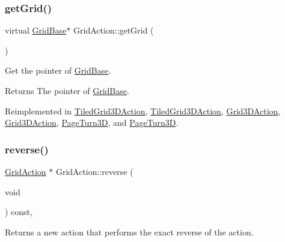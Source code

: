 \subsubsection{\texorpdfstring{get\+Grid()}{getGrid()}\hspace{0.1cm}{\footnotesize\ttfamily [2/2]}}
{\footnotesize\ttfamily virtual \hyperlink{classGridBase}{Grid\+Base}$\ast$ Grid\+Action\+::get\+Grid (\begin{DoxyParamCaption}{ }\end{DoxyParamCaption})\hspace{0.3cm}{\ttfamily [virtual]}}



Get the pointer of \hyperlink{classGridBase}{Grid\+Base}. 

\begin{DoxyReturn}{Returns}
The pointer of \hyperlink{classGridBase}{Grid\+Base}. 
\end{DoxyReturn}


Reimplemented in \hyperlink{classTiledGrid3DAction_a6a959d99477286fe1c467560638f1321}{Tiled\+Grid3\+D\+Action}, \hyperlink{classTiledGrid3DAction_a6481f8c3be55a8edc01527a7d62e9fce}{Tiled\+Grid3\+D\+Action}, \hyperlink{classGrid3DAction_a9b03fb743c9ba963d361b87ce975a642}{Grid3\+D\+Action}, \hyperlink{classGrid3DAction_ad68b52ba318636b43a4c7aab0a9c2887}{Grid3\+D\+Action}, \hyperlink{classPageTurn3D_a69c44c157a7652d2a183dba481bce69a}{Page\+Turn3D}, and \hyperlink{classPageTurn3D_a7b3315a39780438de87cbaa2c9c52c9c}{Page\+Turn3D}.

\mbox{\label{classGridAction_a30591fa53babcd92fb490762fe55b3f7}} 
\subsubsection{\texorpdfstring{reverse()}{reverse()}\hspace{0.1cm}{\footnotesize\ttfamily [1/2]}}
{\footnotesize\ttfamily \hyperlink{classGridAction}{Grid\+Action} $\ast$ Grid\+Action\+::reverse (\begin{DoxyParamCaption}\item[{void}]{ }\end{DoxyParamCaption}) const\hspace{0.3cm}{\ttfamily [override]}, {\ttfamily [virtual]}}

Returns a new action that performs the exact reverse of the action.

